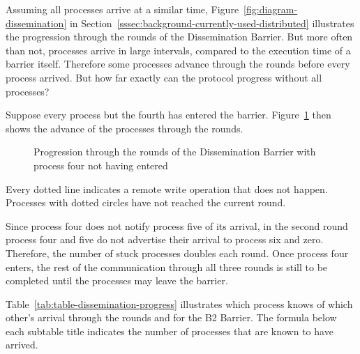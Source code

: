\documentclass[a4paper, 10pt]{article}
\begin{document}
Assuming all processes arrive at a similar time, Figure~\ref{fig:diagram-dissemination} in Section~\ref{sssec:background-currently-used-distributed} illustrates the progression through the rounds of the Dissemination Barrier. But more often than not, processes arrive in large intervals, compared to the execution time of a barrier itself.
Therefore some processes advance through the rounds before every process arrived.
But how far exactly can the protocol progress without all processes?

Suppose every process but the fourth has entered the barrier. Figure~\ref{fig:diagram-dissemination-progress} then shows the advance of the processes through the rounds.

\begin{figure}[htbp]
	\centering
	
	\caption{Progression through the rounds of the Dissemination Barrier with process four not having entered}
	\label{fig:diagram-dissemination-progress}
\end{figure}

Every dotted line indicates a remote write operation that does not happen. Processes with dotted circles have not reached the current round.

Since process four does not notify process five of its arrival, in the second round process four and five do not advertise their arrival to process six and zero.
Therefore, the number of stuck processes doubles each round.
Once process four enters, the rest of the communication through all three rounds is still to be completed until the processes may leave the barrier.

Table~\ref{tab:table-dissemination-progress} illustrates which process knows of which other's arrival through the rounds and for the B2 Barrier. The formula below each subtable title indicates the number of processes that are known to have arrived.
\end{document}
